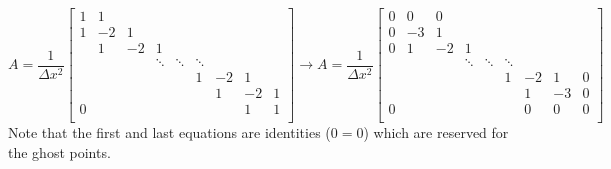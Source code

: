 \documentclass[landscape]{article}
\begin{document}
\[ A = \frac{1}{\Delta x^2} \left[\begin{array}{ccccccccc}
1  & 1     &           &           &           &           &           &         &    \\
1  & -2    & 1         &           &           &           &           &         &    \\
   & 1     & -2        & 1         &           &           &           &         &    \\
   &       &           & \ddots    & \ddots    & \ddots    &           &         &    \\
   &       &           &           &           & 1         & -2        & 1       &    \\
   &       &           &           &           &           &  1        & -2      &  1 \\
0  &       &           &           &           &           &           & 1       &  1 \\
\end{array} \right]
\rightarrow
A = \frac{1}{\Delta x^2} \left[\begin{array}{ccccccccc}
0  & 0     & 0         &           &           &           &           &         &    \\
0  & -3    & 1         &           &           &           &           &         &    \\
0  & 1     & -2        & 1         &           &           &           &         &    \\
   &       &           & \ddots    & \ddots    & \ddots    &           &         &    \\
   &       &           &           &           & 1         & -2        & 1       &  0 \\
   &       &           &           &           &           &  1        & -3      &  0 \\
0  &       &           &           &           &           &  0        & 0       &  0 \\
\end{array} \right]
\]
Note that the first and last equations are identities ($0=0$) which are reserved for the ghost points.
\end{document}

